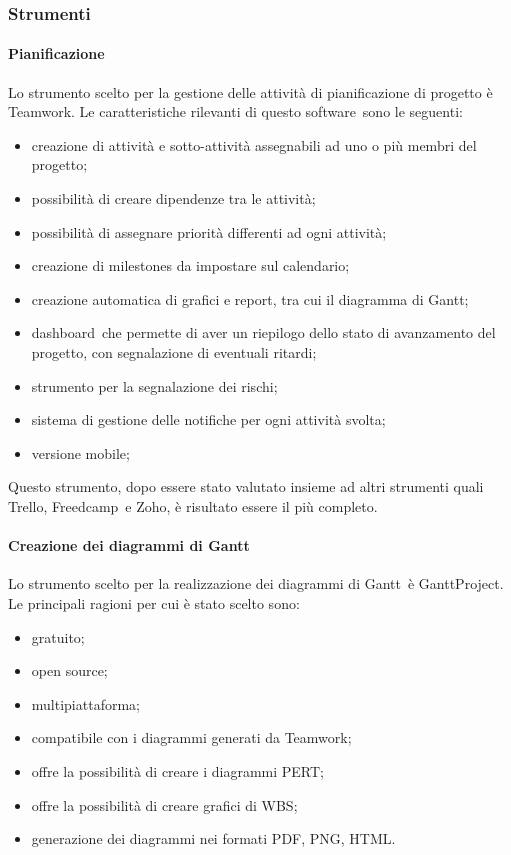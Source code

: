 \documentclass[../NormeProgetto.tex]{subfiles}
\begin{document}
		\subsubsection{Strumenti}
			\paragraph{Pianificazione} \label{sec: Pianificazione Teamwork}
				Lo strumento scelto per la gestione delle attività di pianificazione di progetto è Teamwork\g. Le caratteristiche rilevanti di questo software\g\ sono le seguenti:
				\begin{itemize}
					\item creazione di attività e sotto-attività assegnabili ad uno o più membri del progetto;
					\item possibilità di creare dipendenze tra le attività;
					\item possibilità di assegnare priorità differenti ad ogni attività;
					\item creazione di milestones da impostare sul calendario;
					\item creazione automatica di grafici e report, tra cui il diagramma di Gantt;
					\item dashboard\g\ che permette di aver un riepilogo dello stato di avanzamento del progetto, con segnalazione di eventuali ritardi;
					\item strumento per la segnalazione dei rischi;
					\item sistema di gestione delle notifiche per ogni attività svolta;
					\item versione mobile;
				\end{itemize}		 
				Questo strumento, dopo essere stato valutato insieme ad altri strumenti quali Trello, Freedcamp\g\ e Zoho, è risultato essere il più completo.
			
			\paragraph{Creazione dei diagrammi di Gantt}
				Lo strumento scelto per la realizzazione dei diagrammi di Gantt\g\ è GanttProject. Le principali ragioni per cui è stato scelto sono:
				\begin{itemize}
					\item gratuito;
					\item open source\g;
					\item multipiattaforma;
					\item compatibile con i diagrammi generati da Teamwork\g;
					\item offre la possibilità di creare i diagrammi PERT\g;
					\item offre la possibilità di creare grafici di WBS\g;
					\item generazione dei diagrammi nei formati PDF\g, PNG\g, HTML\g.
				\end{itemize}
\end{document}
